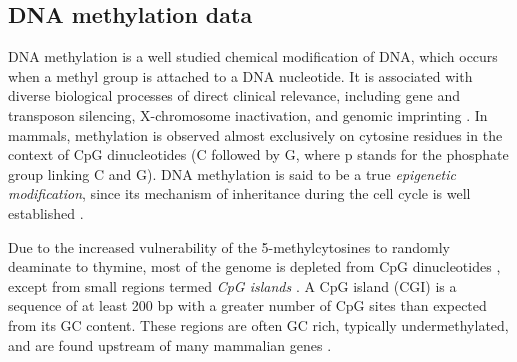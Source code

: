 \subsection{DNA methylation data} \label{dna-methylation-data-sect}
DNA methylation is a well studied chemical modification of DNA, which occurs when a methyl group is attached to a DNA nucleotide. It is associated with diverse biological processes of direct clinical relevance, including gene and transposon silencing, X-chromosome inactivation, and  genomic imprinting \citep{Li1993, Mohandas1981}. In mammals,  methylation is observed almost exclusively on cytosine residues in the context of CpG dinucleotides (\ie C followed by G, where p stands for the phosphate group linking C and G). DNA methylation is said to be a true \emph{epigenetic modification}, since its mechanism of inheritance during the cell cycle is well established \citep{Law2010}. 

Due to the increased vulnerability of the 5-methylcytosines to randomly deaminate to thymine, most of the genome is depleted from CpG dinucleotides \citep{Scarano1967}, except from small regions termed \emph{CpG islands} \citep{Bird2002}. A CpG island (CGI) is a sequence of at least 200 bp with a greater number of CpG sites than expected from its GC content. These regions are often GC rich, typically undermethylated, and are found upstream of many mammalian genes \citep{Law2010}. 

